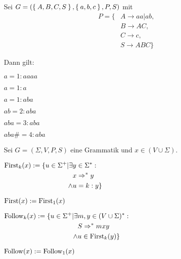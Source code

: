 \begin{beispiel}[$k$-Anfang]
    Sei $G = (\Set{A, B, C, S}, \Set{a, b, c}, P, S)$ mit
    \begin{align*}
        P = \{ &A \rightarrow aa | ab, \\
               &B \rightarrow AC,\\
               &C \rightarrow c,\\
               &S \rightarrow ABC\}
    \end{align*}

    Dann gilt:
    \begin{multicols}{2}
    \begin{bspenum}
        \item $a = 1 : aaaa$
        \item $a = 1 : a$
        \item $a = 1 : aba$
        \item $ab = 2 : aba$
        \item $aba = 3 : aba$
        \item $aba\# = 4 : aba$
    \end{bspenum}
    \end{multicols}
\end{beispiel}

\begin{definition}%
    Sei $G = (\Sigma, V, P, S)$ eine Grammatik und $x \in (V \cup \Sigma)$.

    \begin{defenum}
        \item $\begin{aligned}[t]\operatorname{First}_k (x) := \{u \in \Sigma^+ | \exists &y \in \Sigma^*:\\
              &x \Rightarrow^* y\\
        \land &u = k : y \}\end{aligned}$
        \item $\operatorname{First}(x) := \operatorname{First}_1(x)$
        \item $\begin{aligned}[t]\operatorname{Follow}_k(x) := \{u \in \Sigma^+ | \exists &m, y \in (V \cup \Sigma)^* :\\
              &S \Rightarrow^* mxy\\
        \land &u \in \operatorname{First}_k(y)\}\end{aligned}$
        \item $\operatorname{Follow}(x) := \operatorname{Follow}_1(x)$
    \end{defenum}
\end{definition}

